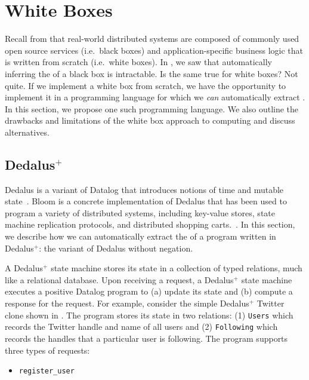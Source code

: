 \newcommand{\dedalusplus}{Dedalus$^+$}

\section{White Boxes}
Recall from  that real-world distributed systems are
composed of commonly used open source services (i.e.\ black boxes) and
application-specific business logic that is written from scratch (i.e.\ white
boxes).  In , we saw that automatically inferring the
\watprovenance{} of a black box is intractable. Is the same true for white
boxes? Not quite. If we implement a white box from scratch, we have the
opportunity to implement it in a programming language for which we \emph{can}
automatically extract \watprovenance{}. In this section, we propose one such
programming language. We also outline the drawbacks and limitations of the
white box approach to computing \watprovenance{} and discuss alternatives.

\subsection{\dedalusplus}
Dedalus is a variant of Datalog that introduces notions of time and mutable
state~\cite{alvaro2011dedalus, marczak2012confluence, alvaro2013declarative}.
Bloom is a concrete implementation of Dedalus that has been used to program
a variety of distributed systems, including key-value stores, state machine
replication protocols, and distributed shopping
carts.~\cite{alvaro2011consistency, conway2012logic}. In this section, we
describe how we can automatically extract the \watprovenance{} of a program
written in \dedalusplus: the variant of Dedalus without negation.

A \dedalusplus{} state machine stores its state in a collection of typed
relations, much like a relational database. Upon receiving a request, a
\dedalusplus{} state machine executes a positive Datalog program to (a) update
its state and (b) compute a response for the request. For example, consider the
simple \dedalusplus{} Twitter clone shown in . The
program stores its state in two relations: (1) \texttt{Users} which records the
Twitter handle and name of all users and (2) \texttt{Following} which records
the handles that a particular user is following. The program supports three
types of requests:
\begin{itemize}
  \item
    \texttt{register\_user}
\end{itemize}

